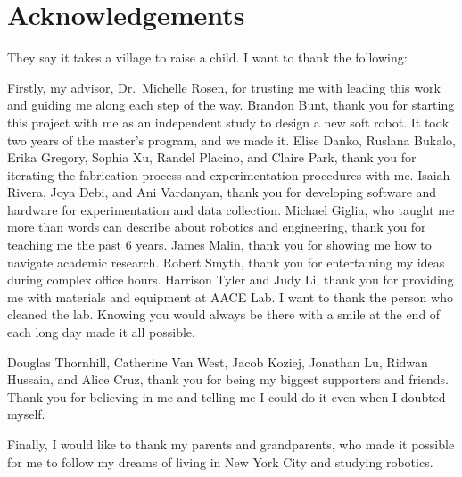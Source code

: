 \section*{Acknowledgements}

They say it takes a village to raise a child. I want to thank the following:

Firstly, my advisor, Dr.~Michelle Rosen, for trusting me with leading this work and guiding me along each step of the way. Brandon Bunt, thank you for starting this project with me as an independent study to design a new soft robot. It took two years of the master's program, and we made it. Elise Danko, Ruslana Bukalo, Erika Gregory, Sophia Xu, Randel Placino, and Claire Park, thank you for iterating the fabrication process and experimentation procedures with me. Isaiah Rivera, Joya Debi, and Ani Vardanyan, thank you for developing software and hardware for experimentation and data collection. Michael Giglia, who taught me more than words can describe about robotics and engineering, thank you for teaching me the past 6 years. James Malin, thank you for showing me how to navigate academic research. Robert Smyth, thank you for entertaining my ideas during complex office hours. Harrison Tyler and Judy Li, thank you for providing me with materials and equipment at AACE Lab. I want to thank the person who cleaned the lab. Knowing you would always be there with a smile at the end of each long day made it all possible. 

Douglas Thornhill, Catherine Van West, Jacob Koziej, Jonathan Lu, Ridwan Hussain, and Alice Cruz, thank you for being my biggest supporters and friends. Thank you for believing in me and telling me I could do it even when I doubted myself.

Finally, I would like to thank my parents and grandparents, who made it possible for me to follow my dreams of living in New York City and studying robotics. 